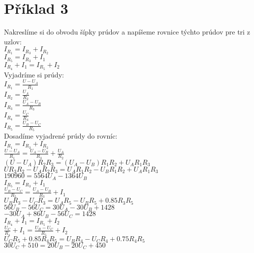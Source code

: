 \section{Příklad 3}
Nakreslíme si do obvodu šípky prúdov a napíšeme rovnice týchto prúdov pre tri z uzlov: \\
$I_{R_1} = I_{R_3} + I_{R_2}$ \\
$I_{R_5} = I_{R_3} + I_1$ \\
$I_{R_4} + I_1 = I_{R_5} + I_2$ \\
\newline
Vyjadríme si prúdy: \\
$I_{R_1} = \frac{U - U_A}{R_1}$ \\
$I_{R_2} = \frac{U_A}{R_2}$ \\
$I_{R_3} = \frac{U_A - U_B}{R_3}$ \\
$I_{R_4} = \frac{U_C}{R_4}$ \\
$I_{R_5} = \frac{U_B - U_C}{R_5}$ \\
\newline
Dosadíme vyjadrené prúdy do rovníc: \\
\newline
$I_{R_1} = I_{R_3} + I_{R_2}$ \\
$\frac{U - U_A}{R_1} = \frac{U_A - U_B}{R_3} + \frac{U_A}{R_2}$ \\
$(U - U_A)R_2R_3 = (U_A - U_B)R_1R_2 + U_AR_1R_3$ \\
$UR_3R_2 - U_AR_2R_3 = U_AR_1R_2 - U_BR_1R_2 + U_AR_1R_3$ \\
$190960 = 5564U_A - 1364U_B$ \\
\newline
$I_{R_5} = I_{R_3} + I_1$ \\
$\frac{U_B - U_C}{R_5} = \frac{U_A - U_B}{R_3} + I_1$ \\
$U_BR_3 - U_CR_3 = U_AR_5 - U_BR_5 + 0.85R_3R_5$ \\
$56U_B - 56U_C = 30U_A - 30U_B + 1428$ \\
$-30U_A + 86U_B - 56U_C = 1428$ \\
\newline
$I_{R_4} + I_1 = I_{R_5} + I_2$ \\
$\frac{U_C}{R_4} + I_1 = \frac{U_B - U_C}{R_5} + I_2$ \\
$U_CR_5 + 0.85R_4R_5 = U_BR_4 - U_CR_4 + 0.75R_4R_5$ \\
$30U_C + 510 = 20U_B - 20U_C + 450$ \\
\newline
\newline
